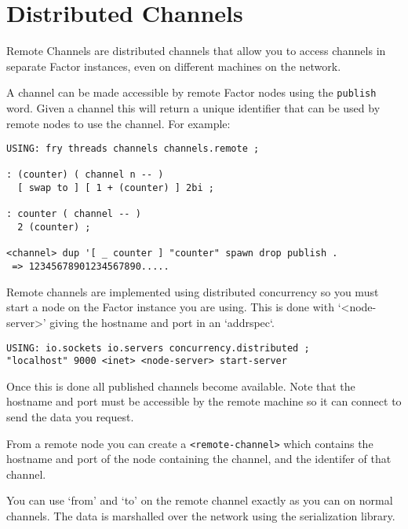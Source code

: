 \chapter{Distributed Channels}\label{dchannels}

Remote Channels are distributed channels that allow you to access
channels in separate Factor instances, even on different machines on
the network. 


A channel can be made accessible by remote Factor nodes using the
\texttt{publish} word. Given a channel this will return a unique
identifier that can be used by remote nodes to use the channel. For
example:

\begin{verbatim}
USING: fry threads channels channels.remote ;

: (counter) ( channel n -- )
  [ swap to ] [ 1 + (counter) ] 2bi ;
    
: counter ( channel -- )
  2 (counter) ;    

<channel> dup '[ _ counter ] "counter" spawn drop publish .
 => 12345678901234567890.....
\end{verbatim}

Remote channels are implemented using
distributed concurrency so you must start a node on the Factor
instance you are using. This is done with `<node-server>' giving the
hostname and port in an `addrspec`.


\begin{verbatim}
USING: io.sockets io.servers concurrency.distributed ;
"localhost" 9000 <inet> <node-server> start-server
\end{verbatim}

Once this is done all published channels become available. Note that
the hostname and port must be accessible by the remote machine so it
can connect to send the data you request.

From a remote node you can create a \texttt{<remote-channel>} which contains
the hostname and port of the node containing the channel, and the identifer
of that channel.

You can use `from' and `to' on the remote channel exactly as you can
on normal channels. The data is marshalled over the network using the
serialization library.  

